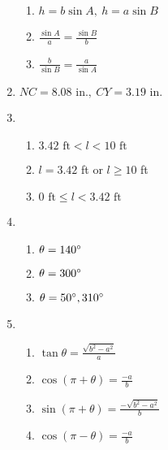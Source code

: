\documentclass{article}
\begin{document}
\begin{enumerate}
\begin{enumerate}
	\item $h = b\sin{A}, \ h = a\sin{B}$
	
	\item $\frac{\sin{A}}{a} = \frac{\sin{B}}{b}$
	
	\item $\frac{b}{\sin{B}} = \frac{a}{\sin{A}}$
	
	\end{enumerate}
	
\item $NC = 8.08 \text{ in.}, \ CY = 3.19 \text{ in.}$

\item 

	\begin{enumerate}
	
	\item $3.42 \text{ ft} < l < 10 \text{ ft}$
	
	\item $l = 3.42$ ft or $l \geq 10$ ft
	
	\item $0 \text{ ft} \leq l < 3.42 \text{ ft}$
	
	\end{enumerate}
	
\item

	\begin{enumerate}
	
	\item $\theta = 140\degree$
	
	\item $\theta = 300\degree$
	
	\item $\theta = 50\degree, 310\degree$
	
	\end{enumerate}
	
\item

	\begin{enumerate}
	
	\item $\tan{\theta} = \frac{\sqrt{b^2 - a^2}}{a}$
	
	\item $\cos{(\pi + \theta)} = \frac{-a}{b}$
	
	\item $\sin{(\pi + \theta)} = \frac{-\sqrt{b^2 - a^2}}{b}$
	
	\item $\cos{(\pi - \theta)} = \frac{-a}{b}$
	

\end{enumerate}
\end{enumerate}
\end{document}
